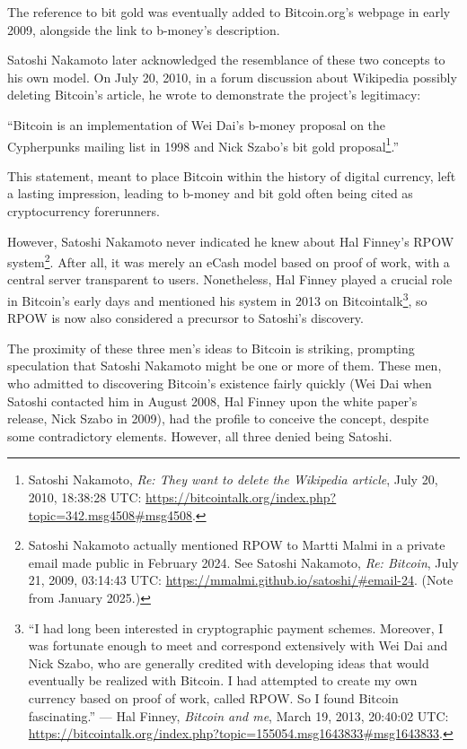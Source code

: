 \documentclass[
  a5paper,
  smalldemyvopaper,10pt,twoside,onecolumn,openright,extrafontsizes,hidelinks]{memoir}
\begin{document}
The reference to bit gold was eventually added to Bitcoin.org's webpage
in early 2009, alongside the link to b-money's description.

Satoshi Nakamoto later acknowledged the resemblance of these two
concepts to his own model. On July 20, 2010, in a forum discussion about
Wikipedia possibly deleting Bitcoin's article, he wrote to demonstrate
the project's legitimacy:

``Bitcoin is an implementation of Wei Dai's b-money proposal on the
Cypherpunks mailing list in 1998 and Nick Szabo's bit gold
proposal\footnote{Satoshi Nakamoto, \emph{Re: They want to delete the
  Wikipedia article}, July 20, 2010, 18:38:28 UTC:
  \url{https://bitcointalk.org/index.php?topic=342.msg4508\#msg4508}.}.''

This statement, meant to place Bitcoin within the history of digital
currency, left a lasting impression, leading to b-money and bit gold
often being cited as cryptocurrency forerunners.

However, Satoshi Nakamoto never indicated he knew about Hal Finney's
RPOW system\footnote{Satoshi Nakamoto actually mentioned RPOW to Martti
  Malmi in a private email made public in February 2024. See Satoshi
  Nakamoto, \emph{Re: Bitcoin}, July 21, 2009, 03:14:43 UTC:
  \url{https://mmalmi.github.io/satoshi/\#email-24}. (Note from January
  2025.)}. After all, it was merely an eCash model based on proof of
work, with a central server transparent to users. Nonetheless, Hal
Finney played a crucial role in Bitcoin's early days and mentioned his
system in 2013 on Bitcointalk\footnote{``I had long been interested in
  cryptographic payment schemes. Moreover, I was fortunate enough to
  meet and correspond extensively with Wei Dai and Nick Szabo, who are
  generally credited with developing ideas that would eventually be
  realized with Bitcoin. I had attempted to create my own currency based
  on proof of work, called RPOW. So I found Bitcoin fascinating.'' ---
  Hal Finney, \emph{Bitcoin and me}, March 19, 2013, 20:40:02 UTC:
  \url{https://bitcointalk.org/index.php?topic=155054.msg1643833\#msg1643833}.},
so RPOW is now also considered a precursor to Satoshi's discovery.

The proximity of these three men's ideas to Bitcoin is striking,
prompting speculation that Satoshi Nakamoto might be one or more of
them. These men, who admitted to discovering Bitcoin's existence fairly
quickly (Wei Dai when Satoshi contacted him in August 2008, Hal Finney
upon the white paper's release, Nick Szabo in 2009), had the profile to
conceive the concept, despite some contradictory elements. However, all
three denied being Satoshi.
\end{document}
